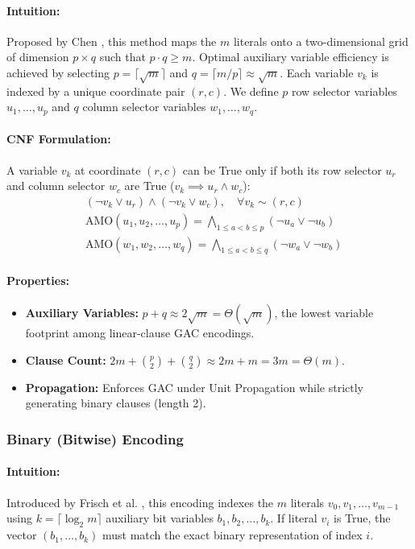 \documentclass[a4paper,fleqn]{cas-sc}
\begin{document}
\paragraph{Intuition:} Proposed by Chen \cite{chen2010new}, this method maps the $m$ literals onto a two-dimensional grid of dimension $p \times q$ such that $p \cdot q \ge m$. Optimal auxiliary variable efficiency is achieved by selecting $p = \lceil \sqrt{m} \rceil$ and $q = \lceil m / p \rceil \approx \sqrt{m}$. Each variable $v_k$ is indexed by a unique coordinate pair $(r, c)$. We define $p$ row selector variables $u_1, \dots, u_p$ and $q$ column selector variables $w_1, \dots, w_q$.
\paragraph{CNF Formulation:}
A variable $v_k$ at coordinate $(r, c)$ can be True only if both its row selector $u_r$ and column selector $w_c$ are True ($v_k \implies u_r \wedge w_c$):
\begin{align}
    & (\neg v_k \vee u_r) \wedge (\neg v_k \vee w_c), \quad \forall v_k \sim (r, c) \label{eq:prod_map} \\
    & \text{AMO}(u_1, u_2, \dots, u_p) = \bigwedge_{1 \le a < b \le p} (\neg u_a \vee \neg u_b) \label{eq:prod_row} \\
    & \text{AMO}(w_1, w_2, \dots, w_q) = \bigwedge_{1 \le a < b \le q} (\neg w_a \vee \neg w_b) \label{eq:prod_col}
\end{align}
\paragraph{Properties:}
\begin{itemize}
    \item \textbf{Auxiliary Variables:} $p + q \approx 2\sqrt{m} = \Theta(\sqrt{m})$, the lowest variable footprint among linear-clause GAC encodings.
    \item \textbf{Clause Count:} $2m + \binom{p}{2} + \binom{q}{2} \approx 2m + m = 3m = \Theta(m)$.
    \item \textbf{Propagation:} Enforces GAC under Unit Propagation while strictly generating binary clauses (length 2).
\end{itemize}

\subsubsection{Binary (Bitwise) Encoding}
\paragraph{Intuition:} Introduced by Frisch et al. \cite{frisch2005symmetry}, this encoding indexes the $m$ literals $v_0, v_1, \dots, v_{m-1}$ using $k = \lceil \log_2 m \rceil$ auxiliary bit variables $b_1, b_2, \dots, b_k$. If literal $v_i$ is True, the vector $(b_1, \dots, b_k)$ must match the exact binary representation of index $i$.
\end{document}
